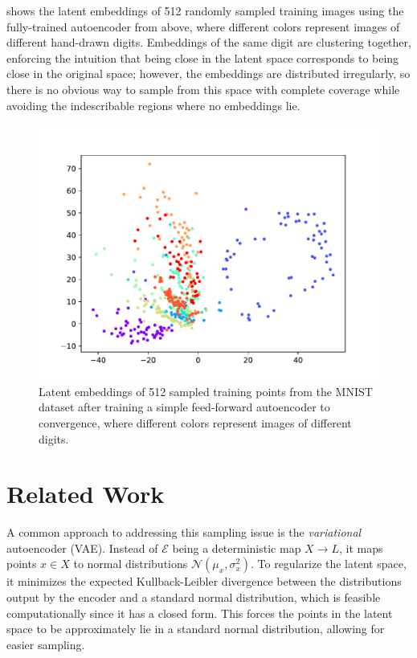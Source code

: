 \documentclass[conference]{IEEEtran}
\begin{document}
 shows the latent embeddings of 512 randomly sampled training images using the fully-trained autoencoder from above, where different colors represent images of different hand-drawn digits. Embeddings of the same digit are clustering together, enforcing the intuition that being close in the latent space corresponds to being close in the original space; however, the embeddings are distributed irregularly, so there is no obvious way to sample from this space with complete coverage while avoiding the indescribable regions where no embeddings lie.

\begin{figure}[H]
	\centering
	\includegraphics[scale=0.5]{fig/bad-latent.pdf}
	\caption{Latent embeddings of 512 sampled training points from the MNIST dataset after training a simple feed-forward autoencoder to convergence, where different colors represent images of different digits.}
	\label{bad-latent}
\end{figure}

\section{Related Work}

A common approach to addressing this sampling issue is the \textit{variational} autoencoder (VAE). Instead of $\mathcal{E}$ being a deterministic map $X\to L$, it maps points $x \in X$ to normal distributions $\mathcal{N}(\mu_{x}, \sigma^{2}_{x})$. To regularize the latent space, it minimizes the expected Kullback-Leibler divergence between the distributions output by the encoder and a standard normal distribution, which is feasible computationally since it has a closed form. This forces the points in the latent space to be approximately lie in a standard normal distribution, allowing for easier sampling.
\end{document}
